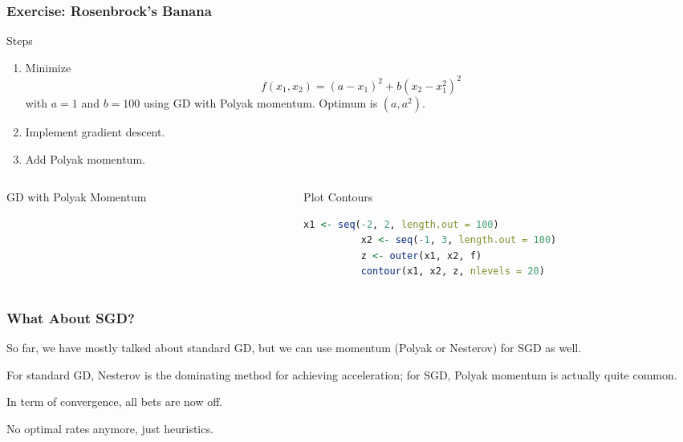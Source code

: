 \documentclass[aspectratio=1610,onlytextwidth]{beamer}
\begin{document}
\begin{frame}[fragile]
  \frametitle{Exercise: Rosenbrock's Banana}

  \begin{block}{Steps}
    \begin{enumerate}
      \item Minimize \[
              f(x_1, x_2) = (a - x_1)^2 + b(x_2 - x_1^2)^2
            \]
            with $a = 1$ and $b = 100$
            using GD with Polyak momentum. Optimum is $(a, a^2)$.
      \item Implement gradient descent.
      \item Add Polyak momentum.
    \end{enumerate}
  \end{block}

  \pause

  \begin{columns}
    \begin{column}{0.45\textwidth}
      \begin{algorithm}[H]
        \KwData{$\gamma >0$, $\mu \in [0,1)$}
        \caption{GD with Polyak Momentum}
      \end{algorithm}
    \end{column}

    \pause

    \begin{column}{0.45\textwidth}
      \begin{block}{Plot Contours}
        \begin{lstlisting}[language=R]
          x1 <- seq(-2, 2, length.out = 100)
          x2 <- seq(-1, 3, length.out = 100)
          z <- outer(x1, x2, f)
          contour(x1, x2, z, nlevels = 20)
        \end{lstlisting}
      \end{block}
    \end{column}
  \end{columns}

  \pause\bigskip

\end{frame}

\begin{frame}[c]
  \frametitle{What About SGD?}
  So far, we have mostly talked about standard GD, but we can use momentum (Polyak or Nesterov)
  for SGD as well.

  \bigskip

  For standard GD, Nesterov is the dominating method for
  achieving acceleration; for SGD, Polyak momentum is actually
  quite common.

  \bigskip

  In term of convergence, all bets are now off.

  \bigskip

  No optimal rates anymore, just heuristics.
\end{frame}
\end{document}
